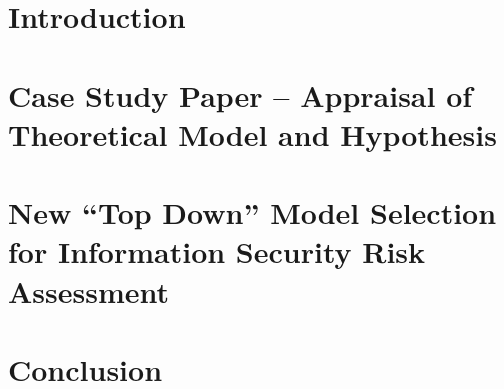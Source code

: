 \documentclass[harvard]{lincolncsthesis}
\begin{document}
\maketitle



\thesisTables
\thesisBodyStart

\chapter{Introduction}


\chapter{Case Study Paper – Appraisal of Theoretical Model and Hypothesis}


\chapter{New ``Top Down'' Model Selection for Information Security Risk Assessment}


\chapter{Conclusion}


\printReferences

\printAppendices
\end{document}
